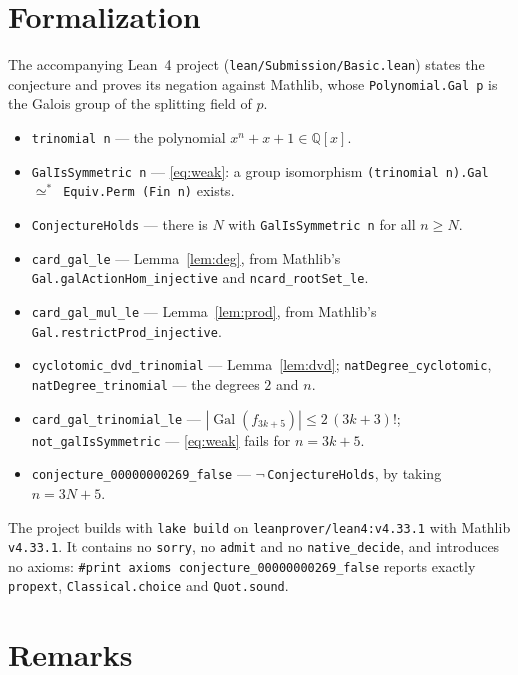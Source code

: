 \documentclass[11pt]{article}
\theoremstyle{plain}
\theoremstyle{remark}
\DeclareMathOperator{\Gal}{Gal}
\begin{document}
\section{Formalization}

The accompanying Lean~4 project (\texttt{lean/Submission/Basic.lean}) states
the conjecture and proves its negation against Mathlib, whose
\texttt{Polynomial.Gal p} is the Galois group of the splitting field of $p$.

\begin{itemize}
  \item \texttt{trinomial n} --- the polynomial $x^n+x+1\in\mathbb Q[x]$.
  \item \texttt{GalIsSymmetric n} --- \eqref{eq:weak}: a group isomorphism
    \texttt{(trinomial n).Gal}~$\simeq^{*}$~\texttt{Equiv.Perm (Fin n)}
    exists.
  \item \texttt{ConjectureHolds} --- there is $N$ with
    \texttt{GalIsSymmetric n} for all $n\ge N$.
  \item \texttt{card\_gal\_le} --- Lemma~\ref{lem:deg}, from Mathlib's
    \texttt{Gal.galActionHom\_injective} and
    \texttt{ncard\_rootSet\_le}.
  \item \texttt{card\_gal\_mul\_le} --- Lemma~\ref{lem:prod}, from Mathlib's
    \texttt{Gal.restrictProd\_injective}.
  \item \texttt{cyclotomic\_dvd\_trinomial} --- Lemma~\ref{lem:dvd};
    \texttt{natDegree\_cyclotomic}, \texttt{natDegree\_trinomial} --- the
    degrees $2$ and $n$.
  \item \texttt{card\_gal\_trinomial\_le} --- $|\Gal(f_{3k+5})|\le 2\,(3k+3)!$;
    \texttt{not\_galIsSymmetric} --- \eqref{eq:weak} fails for $n=3k+5$.
  \item \texttt{conjecture\_00000000269\_false} ---
    $\lnot\,$\texttt{ConjectureHolds}, by taking $n=3N+5$.
\end{itemize}

The project builds with \texttt{lake build} on
\texttt{leanprover/lean4:v4.33.1} with Mathlib \texttt{v4.33.1}. It contains
no \texttt{sorry}, no \texttt{admit} and no \texttt{native\_decide}, and
introduces no axioms: \texttt{\#print axioms
conjecture\_00000000269\_false} reports exactly \texttt{propext},
\texttt{Classical.choice} and \texttt{Quot.sound}.

\section{Remarks}
\end{document}
